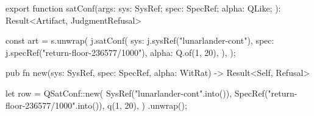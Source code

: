 \begin{tssrc}
export function satConf(args: {
  sys: SysRef;
  spec: SpecRef;
  alpha: QLike;
}): Result<Artifact, JudgmentRefusal>
\end{tssrc}
\begin{tssrc}
const art = s.unwrap(
  j.satConf({
    sys: j.sysRef("lunarlander-cont"),
    spec: j.specRef("return-floor-236577/1000"),
    alpha: Q.of(1, 20),
  }),
);
\end{tssrc}
\begin{rustsrc}
pub fn new(sys: SysRef, spec: SpecRef, alpha: WitRat) -> Result<Self, Refusal>
\end{rustsrc}
\begin{rustsrc}
let row = QSatConf::new(
    SysRef("lunarlander-cont".into()),
    SpecRef("return-floor-236577/1000".into()),
    q(1, 20),
)
.unwrap();
\end{rustsrc}
